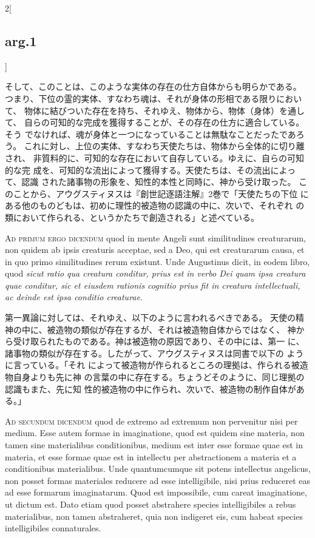 \documentclass[paper=a4paper,fontsize=10pt,jafontsize=9pt,titlepage]{jlreq}
\begin{document}
\begin{paracol}{2}[\subsection{arg.1}]
\switchcolumn

そして、このことは、このような実体の存在の仕方自体からも明らかである。
つまり、下位の霊的実体、すなわち魂は、それが身体の形相である限りにおいて、
 物体に結びついた存在を持ち、それゆえ、物体から、物体（身体）を通して、
 自らの可知的な完成を獲得することが、その存在の仕方に適合している。そう
 でなければ、魂が身体と一つになっていることは無駄なことだったであろう。
 これに対し、上位の実体、すなわち天使たちは、物体から全体的に切り離され、
 非質料的に、可知的な存在において自存している。ゆえに、自らの可知的な完
 成を、可知的な流出によって獲得する。天使たちは、その流出によって、認識
 された諸事物の形象を、知性的本性と同時に、神から受け取った。
このことから、アウグスティヌスは『創世記逐語注解』2巻で「天使たちの下位
 にある他のものどもは、初めに理性的被造物の認識の中に、次いで、それぞれ
 の類において作られる、というかたちで創造される」と述べている。

\switchcolumn*[\subsection{ad.1}]

{\scshape Ad primum ergo dicendum} quod in mente Angeli sunt
similitudines creaturarum, non quidem ab ipsis creaturis acceptae, sed a
Deo, qui est creaturarum causa, et in quo primo similitudines rerum
existunt. Unde Augustinus dicit, in eodem libro, quod {\itshape sicut ratio qua
creatura conditur, prius est in verbo Dei quam ipsa creatura quae
conditur, sic et eiusdem rationis cognitio prius fit in creatura
intellectuali, ac deinde est ipsa conditio creaturae}.

\switchcolumn

第一異論に対しては、それゆえ、以下のように言われるべきである。
天使の精神の中に、被造物の類似が存在するが、それは被造物自体からではなく、
 神から受け取られたものである。神は被造物の原因であり、その中には、第一
 に、諸事物の類似が存在する。したがって、アウグスティヌスは同書で以下の
 ように言っている。「それ
 によって被造物が作られるところの理拠は、作られる被造物自身よりも先に神
 の言葉の中に存在する。ちょうどそのように、同じ理拠の認識もまた、先に知
 性的被造物の中に作られ、次いで、被造物の制作自体がある。」

\switchcolumn*[\subsection{ad.2}]

{\scshape Ad secundum dicendum} quod de extremo ad extremum non
pervenitur nisi per medium. Esse autem formae in imaginatione, quod est
quidem sine materia, non tamen sine materialibus conditionibus, medium
est inter esse formae quae est in materia, et esse formae quae est in
intellectu per abstractionem a materia et a conditionibus
materialibus. Unde quantumcumque sit potens intellectus angelicus, non
posset formas materiales reducere ad esse intelligibile, nisi prius
reduceret eas ad esse formarum imaginatarum. Quod est impossibile, cum
careat imaginatione, ut dictum est. Dato etiam quod posset abstrahere
species intelligibiles a rebus materialibus, non tamen abstraheret, quia
non indigeret eis, cum habeat species intelligibiles connaturales.


\end{paracol}
\end{document}
